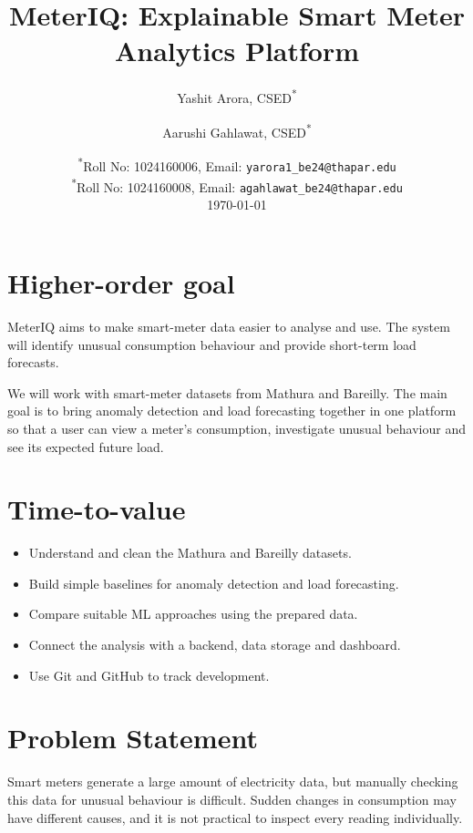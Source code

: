 \documentclass[11pt,a4paper]{article}
\title{MeterIQ: Explainable Smart Meter Analytics Platform}
\author{
  Yashit Arora, CSED\textsuperscript{*}
  \and
  Aarushi Gahlawat, CSED\textsuperscript{*}
}
\date{
  \small
  \textsuperscript{*}Roll No: 1024160006, Email: \texttt{yarora1\_be24@thapar.edu}\\
  \textsuperscript{*}Roll No: 1024160008, Email: \texttt{agahlawat\_be24@thapar.edu}\\[0.5em]
  \today
}
\begin{document}
\maketitle

\section{Higher-order goal}

MeterIQ aims to make smart-meter data easier to analyse and use.
The system will identify unusual consumption behaviour and provide
short-term load forecasts.

We will work with smart-meter datasets from Mathura and Bareilly.
The main goal is to bring anomaly detection and load forecasting
together in one platform so that a user can view a meter's
consumption, investigate unusual behaviour and see its expected
future load.

\section{Time-to-value}

\begin{itemize}[leftmargin=0.7cm]

    \item Understand and clean the Mathura and Bareilly datasets.

    \item Build simple baselines for anomaly detection and load
    forecasting.

    \item Compare suitable ML approaches using the prepared data.

    \item Connect the analysis with a backend, data storage and
    dashboard.

    \item Use Git and GitHub to track development.

\end{itemize}

\section{Problem Statement}

Smart meters generate a large amount of electricity data, but
manually checking this data for unusual behaviour is difficult.
Sudden changes in consumption may have different causes, and it is
not practical to inspect every reading individually.
\end{document}
